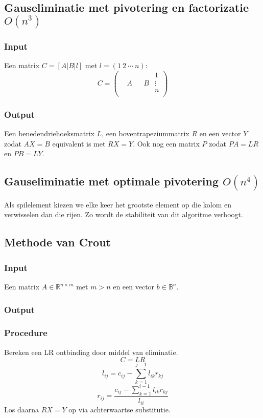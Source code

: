 \documentclass[samenvatting.tex]{subfiles}
\begin{document}
\subsection{Gauseliminatie met pivotering en factorizatie $O(n^3)$}
\subsubsection*{Input}
Een matrix $C = [A|B|l]$ met $ l = \left(1\ 2\ \cdots\ n\right)$:
\[
C = 
\left(
\begin{array}{ccc|c|c}
 & & & &1\\
 &A& &B&\vdots\\
 & & & &n\\ 
\end{array}
\right)
\]

\subsubsection*{Output}
Een benedendriehoeksmatrix $L$, een boventrapeziummatrix $R$ en een vector $Y$ zodat $AX=B$ equivalent is met $RX = Y$. Ook nog een matrix $P$ zodat $PA = LR$ en $PB = LY$.

\subsection{Gauseliminatie met optimale pivotering $O(n^4)$}
Als spilelement kiezen we elke keer het grootste element op die kolom en verwisselen dan die rijen. Zo wordt de stabiliteit van dit algoritme verhoogt.

\subsection{Methode van Crout}
\subsubsection*{Input}
Een matrix $A \in \mathbb{R}^{n\times m}$ met $m>n$ en een vector $b \in \mathbb{B}^{n}$.\\

\subsubsection*{Output}

\subsubsection*{Procedure}
Bereken een LR ontbinding door middel van eliminatie.
\[
C = LR
\]
\[
l_{ij} = c_{ij} - \sum_{k=1}^{j-1}l_{ik}r_{kj}
\]
\[
r_{ij} = \frac{c_{ij}-\sum_{k=1}^{i-1}l_{ik}r_{kj}}{l_{ii}} 
\]
Los daarna $RX = Y$ op via achterwaartse substitutie.
\end{document}

